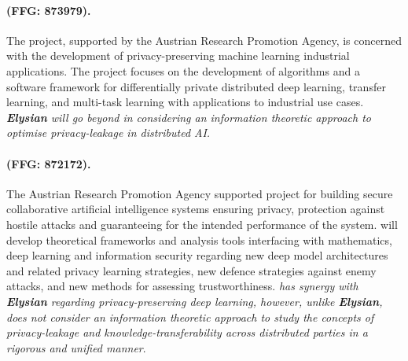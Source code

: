\documentclass[a4paper,11pt]{article}
\newcommand{\project}[1]{\textbf{#1}\xspace}
\newcommand{\SECURITY}{\project{Elysian}}
\newcommand{\TheProject}{\SECURITY}
\begin{document}
\begin{mdframed}[backgroundcolor=blue!5]
\paragraph{\primal (FFG: 873979).}
The \primal project, supported by the Austrian Research Promotion Agency, is concerned with the development of privacy-preserving machine learning industrial applications. The project focuses on the development of algorithms and a software framework for differentially private distributed deep learning, transfer learning, and multi-task learning with applications to industrial use cases. \emph{\TheProject{} will go beyond \primal in considering an information theoretic approach to optimise privacy-leakage in distributed AI.}
 \end{mdframed}

\begin{mdframed}[backgroundcolor=blue!5]
\paragraph{\sthreeai (FFG: 872172).} The Austrian Research Promotion Agency supported \sthreeai project for building secure collaborative artificial intelligence systems ensuring privacy, protection against hostile attacks and guaranteeing for the intended performance of the system. \sthreeai will develop theoretical frameworks and analysis tools interfacing with mathematics, deep learning and information security regarding new deep model architectures and related privacy learning strategies, new defence strategies against enemy attacks, and new methods for assessing trustworthiness. \emph{\sthreeai has synergy with \TheProject{} regarding privacy-preserving deep learning, however, unlike \TheProject{}, \sthreeai does not consider an information theoretic approach to study the concepts of privacy-leakage and knowledge-transferability across distributed parties in a rigorous and unified manner}.    
\end{mdframed}
\end{document}
